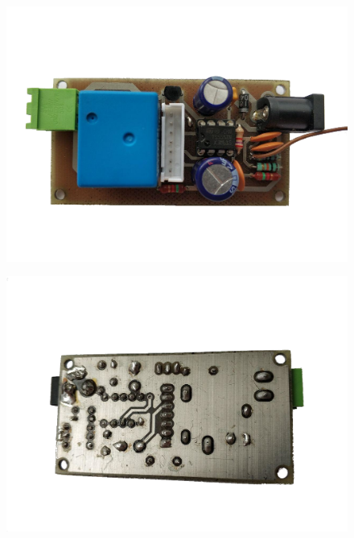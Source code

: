 \documentclass[a4paper, 12pt]{article}
\begin{document}
    \begin{figure}[h!]
    \centering
      \begin{minipage}{.5\textwidth}
        \centering
        \includegraphics[width=.9\linewidth]{graphics/bestueckt_oben.png}
        \label{fig:bestueckt1}
      \end{minipage}%
      \begin{minipage}{.5\textwidth}
        \centering
        \includegraphics[width=.9\linewidth]{graphics/bestueckt_unten.png}
        \label{fig:bestueckt2}
      \end{minipage}
    \end{figure}
\end{document}

